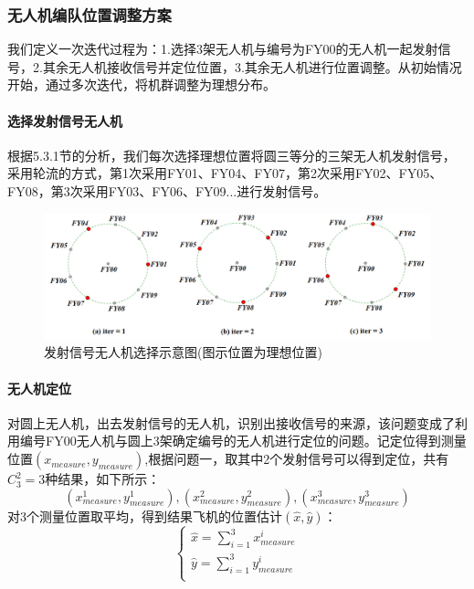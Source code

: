 \documentclass[withoutpreface,bwprint]{cumcmthesis} %
\begin{document}
			
			
			\subsubsection{无人机编队位置调整方案}
			我们定义一次迭代过程为：1.选择3架无人机与编号为FY00的无人机一起发射信号，2.其余无人机接收信号并定位位置，3.其余无人机进行位置调整。从初始情况开始，通过多次迭代，将机群调整为理想分布。
			\paragraph{选择发射信号无人机}
			根据5.3.1节的分析，我们每次选择理想位置将圆三等分的三架无人机发射信号，采用轮流的方式，第1次采用FY01、FY04、FY07，第2次采用FY02、FY05、FY08，第3次采用FY03、FY06、FY09...进行发射信号。
			\begin{figure}[htb]
				\centering
				\includegraphics[width=1.0\linewidth]{./figures/发射信号无人机示意图}
				\caption{发射信号无人机选择示意图(图示位置为理想位置)}
				\label{发射信号飞机}
			\end{figure}
			\paragraph{无人机定位}
			对圆上无人机，出去发射信号的无人机，识别出接收信号的来源，该问题变成了利用编号FY00无人机与圆上3架确定编号的无人机进行定位的问题。记定位得到测量位置$(x_{measure},y_{measure})$,根据问题一，取其中2个发射信号可以得到定位，共有$C^2_3=3$种结果，如下所示：
			$$(x_{measure}^1,y_{measure}^1),(x_{measure}^2,y_{measure}^2),(x_{measure}^3,y_{measure}^3)$$
			对3个测量位置取平均，得到结果飞机的位置估计$(\hat{x},\hat{y})$：
			$$
			\left\{ \begin{array}{l}  \hat{x}=\sum_{i=1}^3{x_{measure}^{i}}\\  \hat{y}=\sum_{i=1}^3{y_{measure}^{i}}\\ \end{array} \right.  
			$$
			
\end{document}
